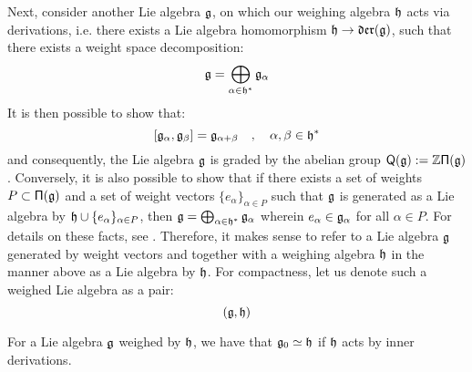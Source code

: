         Next, consider another Lie algebra $\mathfrak{g}$, on which our weighing algebra $\mathfrak{h}$ acts via derivations, i.e. there exists a Lie algebra homomorphism $\mathfrak{h} \to \mathfrak{der}(\mathfrak{g})$, such that there exists a weight space decomposition:
            $$\mathfrak{g} = \bigoplus_{\alpha \in \mathfrak{h}^*} \mathfrak{g}_{\alpha}$$
        It is then possible to show that:
            $$[\mathfrak{g}_{\alpha}, \mathfrak{g}_{\beta}] = \mathfrak{g}_{\alpha + \beta} \quad, \quad \alpha, \beta \in \mathfrak{h}^*$$
        and consequently, the Lie algebra $\mathfrak{g}$ is graded by the abelian group $\mathsf{Q}(\mathfrak{g}) := \mathbb{Z}\mathsf{\Pi}(\mathfrak{g})$. Conversely, it is also possible to show that if there exists a set of weights $P \subset \mathsf{\Pi}(\mathfrak{g})$ and a set of weight vectors $\{ e_{\alpha} \}_{\alpha \in P}$ such that $\mathfrak{g}$ is generated as a Lie algebra by $\mathfrak{h} \cup \{ e_{\alpha} \}_{\alpha \in P}$, then $\mathfrak{g} = \bigoplus_{\alpha \in \mathfrak{h}^*} \mathfrak{g}_{\alpha}$ wherein $e_{\alpha} \in \mathfrak{g}_{\alpha}$ for all $\alpha \in P$. For details on these facts, see \cite[Subsection 2.1, Proposition 2]{moody_pianzola_lie_algebras_with_triangular_decompositions}. Therefore, it makes sense to refer to a Lie algebra $\mathfrak{g}$ generated by weight vectors and together with a weighing algebra $\mathfrak{h}$ in the manner above as a Lie algebra  by $\mathfrak{h}$. For compactness, let us denote such a weighed Lie algebra as a pair:
            $$(\mathfrak{g}, \mathfrak{h})$$
        \begin{remark}
            For a Lie algebra $\mathfrak{g}$ weighed by $\mathfrak{h}$, we have that $\mathfrak{g}_0 \simeq \mathfrak{h}$ if $\mathfrak{h}$ acts by inner derivations.
        \end{remark}
        
